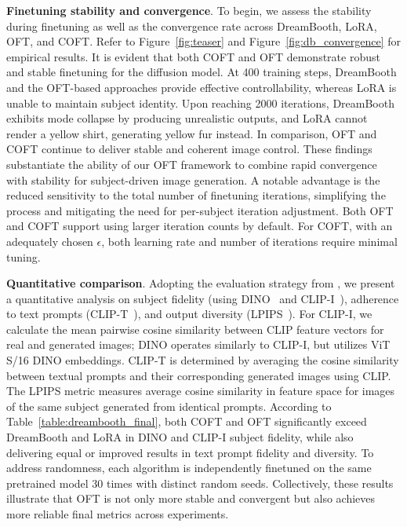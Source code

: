 \textbf{Finetuning stability and convergence}. To begin, we assess the stability during finetuning as well as the convergence rate across DreamBooth, LoRA, OFT, and COFT. Refer to Figure~\ref{fig:teaser} and Figure~\ref{fig:db_convergence} for empirical results. It is evident that both COFT and OFT demonstrate robust and stable finetuning for the diffusion model. At 400 training steps, DreamBooth and the OFT-based approaches provide effective controllability, whereas LoRA is unable to maintain subject identity. Upon reaching 2000 iterations, DreamBooth exhibits mode collapse by producing unrealistic outputs, and LoRA cannot render a yellow shirt, generating yellow fur instead. In comparison, OFT and COFT continue to deliver stable and coherent image control. These findings substantiate the ability of our OFT framework to combine rapid convergence with stability for subject-driven image generation. A notable advantage is the reduced sensitivity to the total number of finetuning iterations, simplifying the process and mitigating the need for per-subject iteration adjustment. Both OFT and COFT support using larger iteration counts by default. For COFT, with an adequately chosen $\epsilon$, both learning rate and number of iterations require minimal tuning.

\textbf{Quantitative comparison}. Adopting the evaluation strategy from \cite{ruiz2023dreambooth}, we present a quantitative analysis on subject fidelity (using DINO~\cite{caron2021emerging} and CLIP-I~\cite{radford2021learning}), adherence to text prompts (CLIP-T~\cite{radford2021learning}), and output diversity (LPIPS~\cite{zhang2018unreasonable}). For CLIP-I, we calculate the mean pairwise cosine similarity between CLIP feature vectors for real and generated images; DINO operates similarly to CLIP-I, but utilizes ViT S/16 DINO embeddings. CLIP-T is determined by averaging the cosine similarity between textual prompts and their corresponding generated images using CLIP. The LPIPS metric measures average cosine similarity in feature space for images of the same subject generated from identical prompts. According to Table~\ref{table:dreambooth_final}, both COFT and OFT significantly exceed DreamBooth and LoRA in DINO and CLIP-I subject fidelity, while also delivering equal or improved results in text prompt fidelity and diversity. To address randomness, each algorithm is independently finetuned on the same pretrained model 30 times with distinct random seeds. Collectively, these results illustrate that OFT is not only more stable and convergent but also achieves more reliable final metrics across experiments.

